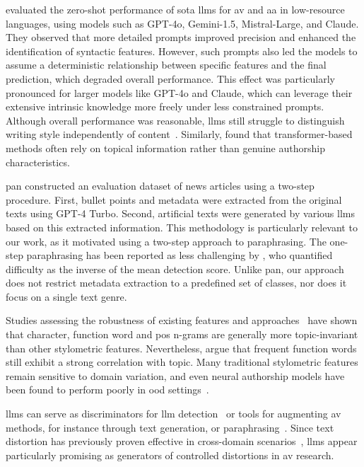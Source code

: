 \citet{schmidt_llm_av_latin_24} evaluated the zero-shot performance of \acl{sota} \acp{llm} for \ac{av} and \ac{aa} in low-resource languages, using models such as GPT-4o, Gemini-1.5, Mistral-Large, and Claude. 
They observed that more detailed prompts improved precision and enhanced the identification of syntactic features. 
However, such prompts also led the models to assume a deterministic relationship between specific features and the final prediction, which degraded overall performance. 
This effect was particularly pronounced for larger models like GPT-4o and Claude, which can leverage their extensive intrinsic knowledge more freely under less constrained prompts. 
Although overall performance was reasonable, \acp{llm} still struggle to distinguish writing style independently of content~\citep{schmidt_llm_av_latin_24}. 
Similarly, \citet{nguyen_bert_topic_av_2023} found that transformer-based methods often rely on topical information rather than genuine authorship characteristics.

\ac{pan} constructed an evaluation dataset of news articles using a two-step procedure.
First, bullet points and metadata were extracted from the original texts using GPT-4 Turbo.
Second, artificial texts were generated by various \acp{llm} based on this extracted information. 
This methodology is particularly relevant to our work, as it motivated using a two-step approach to paraphrasing. 
The one-step paraphrasing has been reported as less challenging by \citet{bevendorff_overview_2024}, who quantified difficulty as the inverse of the mean detection score.
Unlike \ac{pan}, our approach does not restrict metadata extraction to a predefined set of classes, nor does it focus on a single text genre. 

Studies assessing the robustness of existing features and approaches~\citep{stamatatos_survey_2009,barlas_cross_domain_2020} have shown that character, function word and \ac{pos} n-grams are generally more topic-invariant than other stylometric features.
Nevertheless, \citet{bischoff_importance_2020} argue that frequent function words still exhibit a strong correlation with topic.
Many traditional stylometric features remain sensitive to domain variation, and even neural authorship models have been found to perform poorly in \ac{ood} settings~\citep{rivera_soto_learning_2021}.

\acp{llm} can serve as discriminators for \ac{llm} detection~\citep{futrzynski_pairwise_2021} or tools for augmenting \ac{av} methods, for instance through text generation, or paraphrasing~\citep{mao_raidar_2024,baradia_mirror_2025}.
Since text distortion has previously proven effective in cross-domain scenarios~\citep{bischoff_importance_2020}, \acp{llm} appear particularly promising as generators of controlled distortions in \ac{av} research.

